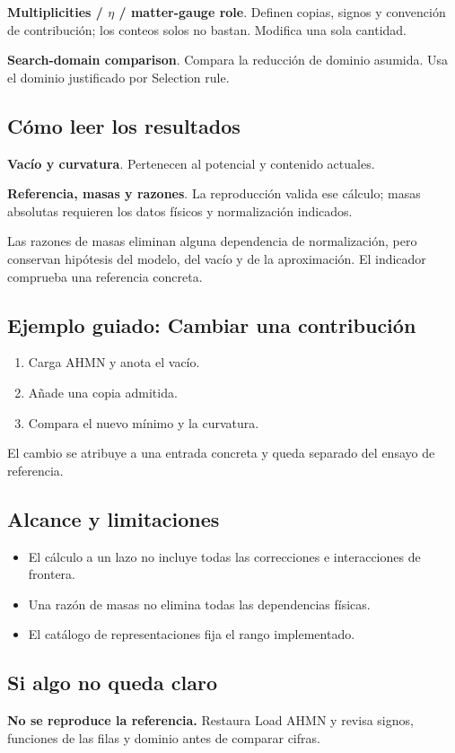 \documentclass[11pt,a4paper]{article}
\begin{document}
\textbf{Multiplicities / \ensuremath{\eta} / matter-gauge role}. Definen copias, signos y convención de contribución; los conteos solos no bastan. Modifica una sola cantidad.

\textbf{Search-domain comparison}. Compara la reducción de dominio asumida. Usa el dominio justificado por Selection rule.

\subsection*{Cómo leer los resultados}
\textbf{Vacío y curvatura}. Pertenecen al potencial y contenido actuales.

\textbf{Referencia, masas y razones}. La reproducción valida ese cálculo; masas absolutas requieren los datos físicos y normalización indicados.

Las razones de masas eliminan alguna dependencia de normalización, pero conservan hipótesis del modelo, del vacío y de la aproximación. El indicador comprueba una referencia concreta.
\subsection*{Ejemplo guiado: Cambiar una contribución}
\begin{enumerate}
\item Carga AHMN y anota el vacío.
\item Añade una copia admitida.
\item Compara el nuevo mínimo y la curvatura.
\end{enumerate}
El cambio se atribuye a una entrada concreta y queda separado del ensayo de referencia.
\subsection*{Alcance y limitaciones}
\begin{itemize}
\item El cálculo a un lazo no incluye todas las correcciones e interacciones de frontera.
\item Una razón de masas no elimina todas las dependencias físicas.
\item El catálogo de representaciones fija el rango implementado.
\end{itemize}
\subsection*{Si algo no queda claro}
\textbf{No se reproduce la referencia.} Restaura Load AHMN y revisa signos, funciones de las filas y dominio antes de comparar cifras.
\end{document}
